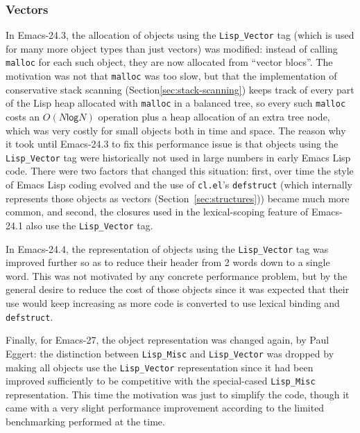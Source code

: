 \documentclass[format=acmsmall, review]{acmart}
\newcommand \Elisp {Emacs Lisp}
\begin{document}

\subsubsection{Vectors}
In Emacs-24.3, the allocation of objects using the \texttt{Lisp\_Vector} tag
(which is used for many more object types than just vectors) was modified:
instead of calling \texttt{malloc} for each such object, they are now
allocated from ``vector blocs''.  The motivation was not that
\texttt{malloc} was too slow, but that the implementation of conservative
stack scanning (Section\ref{sec:stack-scanning}) keeps track of every part
of the Lisp
heap allocated with \texttt{malloc} in a balanced tree, so every such
\texttt{malloc} costs an $O(N \textsf{log} N)$ operation plus a heap
allocation of an extra tree node, which was very costly for small objects
both in time and space.  The reason why it took until Emacs-24.3 to fix this
performance issue is that objects using the \texttt{Lisp\_Vector} tag were
historically not used in large numbers in early \Elisp{} code.  There were
two factors that changed this situation: first, over time the style of
\Elisp{} coding evolved and the use of \texttt{cl.el}'s \texttt{defstruct}
(which internally represents those objects as vectors
(Section~\ref{sec:structures})) became much more common, and second, the
closures used in the lexical-scoping feature of Emacs-24.1 also use the
\texttt{Lisp\_Vector} tag.

In Emacs-24.4, the representation of objects using the \texttt{Lisp\_Vector}
tag was improved further so as to reduce their header from 2 words down to
a single word.  This was not motivated by any concrete performance problem,
but by the general desire to reduce the cost of those objects since it was
expected that their use would keep increasing as more code is converted to
use lexical binding and \texttt{defstruct}.

Finally, for Emacs-27, the object representation was changed again, by Paul
Eggert: the distinction between \texttt{Lisp\_Misc} and
\texttt{Lisp\_Vector} was dropped by making all objects use the
\texttt{Lisp\_Vector} representation since it had been improved sufficiently
to be competitive with the special-cased \texttt{Lisp\_Misc} representation.
This time the motivation was just to simplify the code, though it came with
a very slight performance improvement according to the limited benchmarking
performed at the time.
\end{document}
